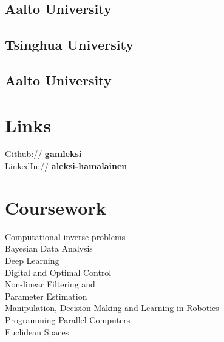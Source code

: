 \documentclass[]{deedy-resume}
\begin{document}
\begin{minipage}[t]{0.33\textwidth}
\subsection{Aalto University}
\sectionsep

\subsection{Tsinghua University}
\sectionsep

\subsection{Aalto University}
\sectionsep


\section{Links} 
Github:// \href{https://github.com/gamleksi}{\bf gamleksi} \\
LinkedIn://  \href{https://www.linkedin.com/in/aleksi-hamalainen}{\bf aleksi-hamalainen} \\
\sectionsep



\section{Coursework}
\textbullet{} Computational inverse problems \\
\textbullet{} Bayesian Data Analysis \\
\textbullet{} Deep Learning \\
\textbullet{} Digital and Optimal Control \\
\textbullet{} Non-linear Filtering and \\ Parameter Estimation \\
\textbullet{} Manipulation, Decision Making and Learning in Robotics \\
\textbullet{} Programming Parallel Computers  \\
\textbullet{} Euclidean Spaces \\
\sectionsep


\end{minipage}
\end{document}
